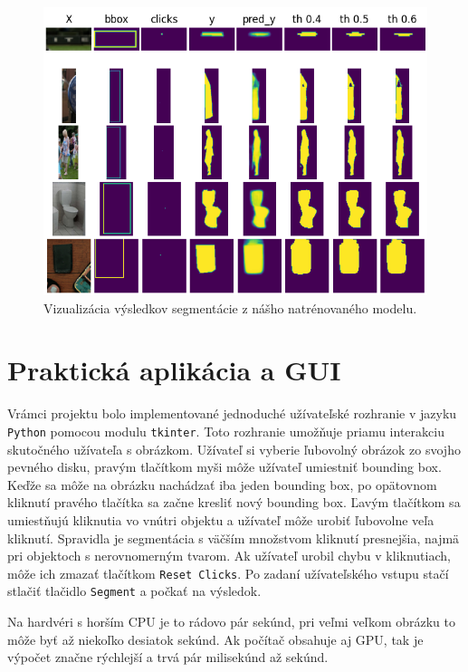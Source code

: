 \documentclass [11pt, a4paper, twocolumn]{article}
\begin{document}
\begin{figure}[H]
\centering
\includegraphics[width=\linewidth]{results3}
\caption{Vizualizácia výsledkov segmentácie z nášho natrénovaného modelu.}
\end{figure}

\section{Praktická aplikácia a GUI}

Vrámci projektu bolo implementované jednoduché užívateľské rozhranie v jazyku \texttt{Python} pomocou modulu \texttt{tkinter}. Toto rozhranie umožňuje priamu interakciu skutočného užívateľa s obrázkom. Užívateľ si vyberie ľubovolný obrázok zo svojho pevného disku, pravým tlačítkom myši môže užívateľ umiestniť bounding box. Keďže sa môže na obrázku nachádzať iba jeden bounding box, po opätovnom kliknutí pravého tlačítka sa začne kresliť nový bounding box. Ľavým tlačítkom sa umiestňujú kliknutia vo vnútri objektu a užívateľ môže urobiť ľubovolne veľa kliknutí. Spravidla je segmentácia s väčším množstvom kliknutí presnejšia, najmä pri objektoch s nerovnomerným tvarom. Ak užívateľ urobil chybu v kliknutiach, môže ich zmazať tlačítkom \texttt{Reset Clicks}. Po zadaní užívateľského vstupu stačí stlačiť tlačidlo \texttt{Segment} a počkať na výsledok.

Na hardvéri s horším CPU je to rádovo pár sekúnd, pri veľmi veľkom obrázku to môže byť až niekoľko desiatok sekúnd. Ak počítač obsahuje aj GPU, tak je výpočet značne rýchlejší a trvá pár milisekúnd až sekúnd.
\end{document}
